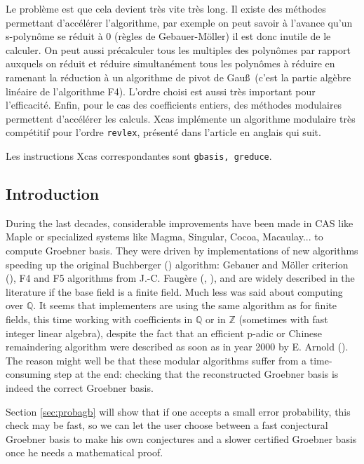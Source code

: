 \documentclass[a4paper,11pt]{article}
\newcommand{\Z}{{\mathbb{Z}}}
\newcommand{\Q}{{\mathbb{Q}}}
\begin{document}
\begin{giacjshere}
Le problème est que cela devient très vite très long. Il existe
des méthodes permettant d'accélérer l'algorithme, par exemple
on peut savoir à l'avance qu'un s-polynôme se réduit à 0
(règles de Gebauer-Möller) il est donc inutile de le calculer.
On peut aussi précalculer tous les multiples des polynômes
par rapport auxquels on réduit et réduire simultanément
tous les polynômes à réduire en ramenant la réduction
à un algorithme de pivot de Gau\ss\ (c'est la partie
algèbre linéaire de l'algorithme F4). L'ordre choisi
est aussi très important pour l'efficacité. Enfin, pour le cas des
coefficients entiers, des méthodes modulaires permettent
d'accélérer les calculs. Xcas implémente un algorithme modulaire
très compétitif pour l'ordre {\tt revlex}, présenté
dans l'article en anglais qui suit.

Les instructions Xcas correspondantes sont {\tt gbasis, greduce}.



\subsection{Introduction}
During the last decades, considerable improvements have been made 
in CAS like Maple or specialized systems like Magma, Singular, 
Cocoa, Macaulay... to compute Groebner basis. 
They were driven by
implementations of new algorithms speeding up the original Buchberger 
(\cite{buchberger1985grobner})
algorithm: Gebauer and M\"oller criterion (\cite{Gebauer1988275}), F4 and F5
algorithms from J.-C. Faug\`ere (\cite{F99a}, \cite{Fau02a}), and are widely described in the
literature if the base field is a finite field.
Much less was said about computing over $\Q$. It seems that
implementers are using the same algorithm as for finite fields,
this time working with coefficients in $\Q$ or in $\Z$ (sometimes
with fast integer linear algebra), 
despite the fact that an efficient p-adic or Chinese remaindering
algorithm were described as soon as in year 2000 by E. Arnold
(\cite{Arnold2003403}). 
The reason might well be that these modular algorithms suffer from a
time-consuming step at the end: checking that the reconstructed
Groebner basis is indeed the correct Groebner basis.

Section \ref{sec:probagb}
will show that if one accepts a small error probability, this check 
may be fast, so we can let the user choose between a fast conjectural
Groebner basis to make his own conjectures and a slower certified
Groebner basis once he needs a mathematical proof.


\end{giacjshere}
\end{document}
